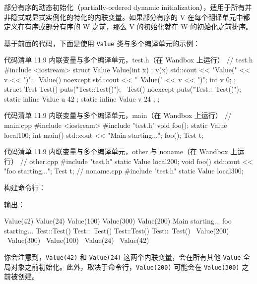 
\begin{myQuote}
部分有序的动态初始化（partially-ordered dynamic initialization），适用于所有并非隐式或显式实例化的特化的内联变量。如果部分有序的 V 在每个翻译单元中都定义在有序或部分有序的 W 之前，那么 V 的初始化就在 W 的初始化之前排序。
\end{myQuote}

基于前面的代码，下面是使用 \texttt{Value} 类与多个编译单元的示例：

\begin{codeboxt}[cpp]{代码清单 11.9 内联变量与多个编译单元，test.h（在 Wandbox 上运行）}
// test.h
#include <iostream>
struct Value {
Value(int x) : v(x) { std::cout << "Value(" << v << ")\n"; }
~Value() noexcept { std::cout << "~Value(" << v << ")\n"; }
int v {0};
};
struct Test {
Test() { puts("Test::Test()"); }
~Test() noexcept { puts("Test::~Test()"); }
static inline Value u { 42 };
static inline Value v { 24 };
};
\end{codeboxt}

\begin{codeboxt}[cpp]{代码清单 11.9 内联变量与多个编译单元，main（在 Wandbox 上运行）}
// main.cpp
#include <iostream>
#include "test.h"
void foo();
static Value local{100};
int main() {
std::cout << "Main starting...\n";
foo();
Test t;
}
\end{codeboxt}

\begin{codeboxt}[cpp]{代码清单 11.9 内联变量与多个编译单元，other 与 noname（在 Wandbox 上运行）}
// other.cpp
#include "test.h"
static Value local{200};
void foo() {
std::cout << "foo starting...\n";
Test t;
}
// noname.cpp
#include "test.h"
static Value local{300};
\end{codeboxt}

构建命令行：


输出：

\begin{codebox}[cpp]
Value(42)
Value(24)
Value(100)
Value(300)
Value(200)
Main starting...
foo starting...
Test::Test()
Test::~Test()
Test::Test()
Test::~Test()
~Value(200)
~Value(300)
~Value(100)
~Value(24)
~Value(42)
\end{codebox}

你会注意到，\texttt{Value(42)} 和 \texttt{Value(24)} 这两个内联变量，会在所有其他 \texttt{Value} 全局对象之前初始化。此外，取决于命令行，\texttt{Value(200)} 可能会在 \texttt{Value(300)} 之前被创建。

